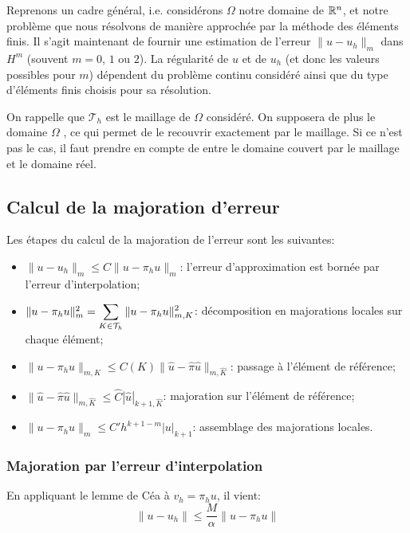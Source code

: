 Reprenons un cadre général, i.e. considérons $\Omega$ notre domaine
de $\mathbb R^n$, et notre problème que nous résolvons de manière approchée
par la méthode des éléments finis.
Il s'agit maintenant de fournir une estimation de l'erreur $\|u-u_h\|_m$ dans $H^m$
(souvent $m = 0$, $1$ ou $2$).
La régularité de $u$ et de $u_h$ (et donc les valeurs possibles pour $m$) dépendent
du problème continu considéré ainsi que du type d'éléments finis choisis pour sa
résolution.

\medskip
On rappelle que $\mathcal{T}_h$ est le maillage de $\Omega$ considéré.
On supposera de plus le domaine $\Omega$ ,
ce qui permet de le recouvrir exactement par le maillage.
Si ce n'est pas le cas, il faut prendre en compte de  entre le domaine couvert
par le maillage et le domaine réel.


\medskip
\subsection{Calcul de la majoration d'erreur}

Les étapes du calcul de la majoration de l'erreur sont les suivantes:
\begin{itemize}
  \item $\|u-u_h\|_m\le C\|u-\pi_hu\|_m$: l'erreur d'approximation est bornée par l'erreur
	d'interpolation;
  \item $\|u-\pi_hu\|^2_m=\displaystyle\sum_{K\in\mathcal{T}_h}\|u-\pi_hu\|^2_{m,K}$:
	décomposition en majorations locales sur chaque élément;
  \item $\|u-\pi_hu\|_{m,K}\le C(K)\|\hat{u}-\hat{\pi}\hat{u}\|_{m,\hat{K}}$:
	passage à l'élément de référence;
  \item $\|\hat{u}-\hat{\pi}\hat{u}\|_{m,\hat{K}}\le \hat{C}|\hat{u}|_{k+1,\hat{K}}$:
	majoration sur l'élément de référence;
  \item $\|u-\pi_hu\|_m\le C'h^{k+1-m}|u|_{k+1}$:
	assemblage des majorations locales.
\end{itemize}

\medskip
\subsubsection{Majoration par l'erreur d'interpolation}

En appliquant le lemme de Céa à $v_h=\pi_hu$, il vient:
\begin{equation}
\|u-u_h\|\le\dfrac{M}{\alpha}\|u-\pi_hu\|
\end{equation}

